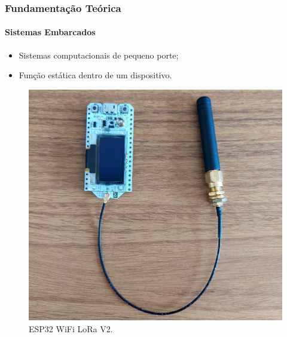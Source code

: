 \documentclass[aspectratio=169]{beamer}
\begin{document}
\begin{frame}

\frametitle{Fundamentação Teórica}
\framesubtitle{Sistemas Embarcados}

\begin{itemize}
    \item Sistemas computacionais de pequeno porte;
    \item Função estática dentro de um dispositivo.
\end{itemize}

\begin{figure}
  \centering
  \includegraphics[scale=0.16]{img/HW.jpg}
  \caption{ESP32 WiFi LoRa V2.}
\end{figure}

\end{frame}
\end{document}
